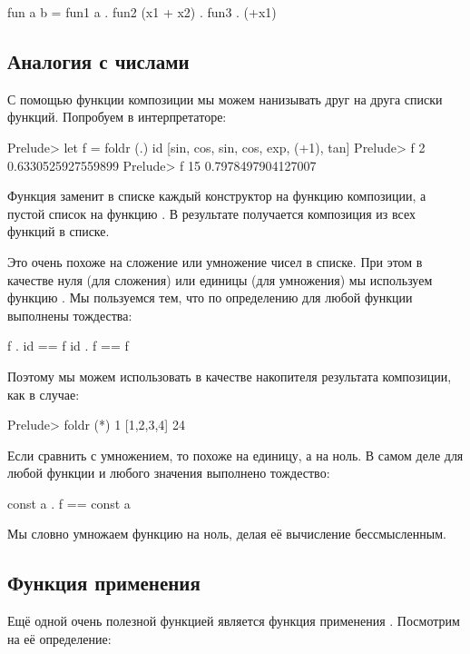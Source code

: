 \begin{code}
fun a b = fun1 a . fun2 (x1 + x2) . fun3 . (+x1) 
\end{code}

\subsection{Аналогия с числами}


С помощью функции композиции мы можем нанизывать
друг на друга списки функций. Попробуем в интерпретаторе: 

\begin{code}
Prelude> let f = foldr (.) id [sin, cos, sin, cos, exp, (+1), tan]
Prelude> f 2
0.6330525927559899
Prelude> f 15
0.7978497904127007
\end{code}

Функция  заменит в списке каждый конструктор  \In{(:)}
на функцию композиции, а пустой список на функцию . 
В результате получается композиция из всех функций в списке.

Это очень похоже на сложение или умножение чисел в списке.
При этом в качестве нуля (для сложения) или единицы (для умножения)
мы используем функцию . Мы пользуемся тем, что по
определению для любой функции  выполнены тождества:

\begin{code}
f  . id  ==  f
id . f   ==  f
\end{code}

Поэтому мы можем использовать  в качестве накопителя 
результата композиции, как в случае: 

\begin{code}
Prelude> foldr (*) 1 [1,2,3,4]
24
\end{code}

Если сравнить  с умножением, то  похоже
на единицу, а  на ноль. В самом деле для 
любой функции  и любого значения  выполнено
тождество:

\begin{code}
const a  .  f  == const a
\end{code}

Мы словно умножаем функцию на ноль, делая 
её вычисление бессмысленным. 

\subsection{Функция применения}

Ещё одной очень полезной функцией является функция применения \In{($)}.
Посмотрим на её определение:

